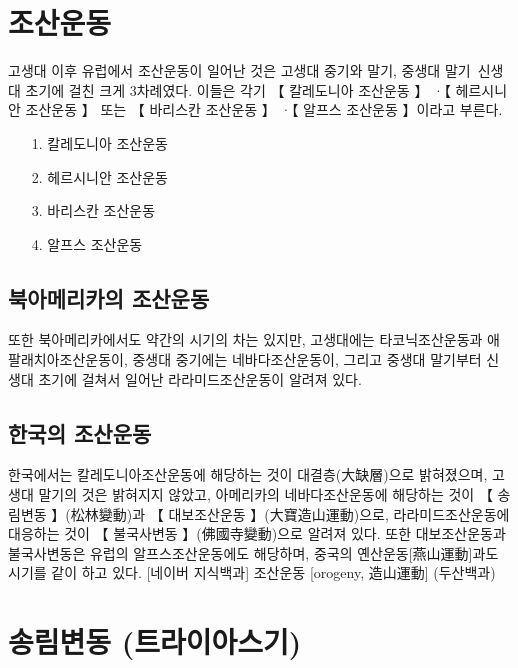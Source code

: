 \documentclass[12pt,a4paper]{book}
\newcommand{\SectionMargin}			{\newpage  \null \vskip 0cm}
\begin{document}
	\SectionMargin
	\section{	조산운동}


		고생대 이후 유럽에서 조산운동이 일어난 것은 
		고생대 중기와 말기, 중생대 말기~신생대 초기에 걸친 크게 3차례였다. 
		이들은 각기 【 칼레도니아 조산운동 】 ·【 헤르시니안 조산운동 】 또는 【 바리스칸 조산운동 】 ·【 알프스 조산운동 】이라고 부른다. 


		\begin{enumerate}[leftmargin=3cm]
		\item[1.]		칼레도니아 조산운동
		\item[2.]		헤르시니안 조산운동
		\item[3.]		바리스칸 조산운동
		\item[4.]		알프스 조산운동
		\end{enumerate}


		\subsection{북아메리카의 조산운동}			
		또한 북아메리카에서도 약간의 시기의 차는 있지만, 고생대에는 타코닉조산운동과 애팔래치아조산운동이, 
		중생대 중기에는 네바다조산운동이, 그리고 중생대 말기부터 신생대 초기에 걸쳐서 일어난 라라미드조산운동이 알려져 있다. 

		\subsection{한국의 조산운동}
		한국에서는 칼레도니아조산운동에 해당하는 것이 대결층(大缺層)으로 밝혀졌으며, 
		고생대 말기의 것은 밝혀지지 않았고, 
		아메리카의 네바다조산운동에 해당하는 것이 【 송림변동 】(松林變動)과 【 대보조산운동 】(大寶造山運動)으로, 
		라라미드조산운동에 대응하는 것이 【 불국사변동 】(佛國寺變動)으로 알려져 있다. 
		또한 대보조산운동과 불국사변동은 유럽의 알프스조산운동에도 해당하며, 중국의 옌산운동[燕山運動]과도 시기를 같이 하고 있다. 
		[네이버 지식백과] 조산운동 [orogeny, 造山運動] (두산백과)





	\SectionMargin
	\section{	송림변동 (트라이아스기)}
\end{document}
